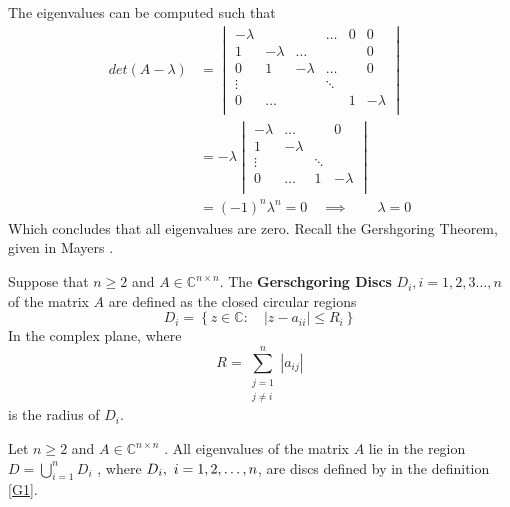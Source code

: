 \documentclass{article}
\theoremstyle{remark}
\newcommand{\newpara}
  {
  \vskip 0.4cm
  }
\begin{document}
\newpara
The eigenvalues can be computed such that \[
  \begin{split}
  det \left( A - \lambda   \right) &= \begin{vmatrix} 
  -\lambda &   &   &      \ldots  & 0 & 0 \\
  1  &  -\lambda  & \ldots  &   &   & 0 \\
  0  & 1  & - \lambda   &  \ldots  &   & 0 \\
  \vdots  &   &  &   \ddots  \\
  0  &  \ldots  &  &    & 1    & - \lambda      \\
  \end{vmatrix} 
    \\
   &= -\lambda  \begin{vmatrix} 
   -\lambda   &  \ldots  &      & 0 \\
  1  & - \lambda  &      \\
  \vdots  & &    \ddots  \\
  0  &  \ldots & 1    & -\lambda      \\
  \end{vmatrix} 
    \\
   &=\left( -1 \right)^{n}   \lambda^{n}  = 0 \quad   \implies  \quad \quad \lambda  = 0
  \end{split} 
\] 
Which concludes that all eigenvalues are zero. Recall the Gershgoring Theorem, given in Mayers \cite{sul}.
\begin{definition}
  \label{G1}
  Suppose that $n\ge2 $ and $A \in  \mathbb{C} ^{n \times n }$. The \textbf{Gerschgoring Discs} $D_{i},  i = 1,2,3 \ldots, n$ of the matrix $A$ are defined as the closed circular regions \[
  D_{i} = \left\{ z \in  \mathbb{C}  : \quad    \left\lvert z - a_{ii} \right\rvert \le R_{i} \right\}
  \] 
  In the complex plane, where \[
  R = \sum_{\substack{j = 1 \\ j \neq i} }^{n}  \left\lvert a_{ij} \right\rvert 
  \] 
  is the radius of $D_{i}$.
  
\end{definition}

\begin{theorem}
  \label{G2}
  Let $n\ge2$ and $A \in  \mathbb{C} ^{n \times  n}$ . All eigenvalues of the matrix $A$ lie in the region $D =  \bigcup_{i=1}^{n} D_{i}$ , where $D_{i}, \\\ i = 1,2,\ldots,n $, are discs defined by in the definition \ref{G1}.
\end{theorem}
\end{document}
